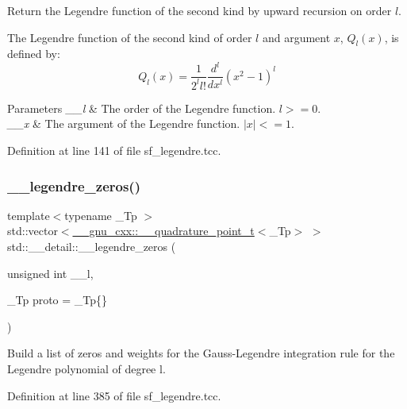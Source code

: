 Return the Legendre function of the second kind by upward recursion on order $ l $. 

The Legendre function of the second kind of order $ l $ and argument $ x $, $ Q_l(x) $, is defined by\+: \[ Q_l(x) = \frac{1}{2^l l!}\frac{d^l}{dx^l}(x^2 - 1)^{l} \]


\begin{DoxyParams}{Parameters}
{\em \+\_\+\+\_\+l} & The order of the Legendre function. $l >= 0$. \\
\hline
{\em \+\_\+\+\_\+x} & The argument of the Legendre function. $|x| <= 1$. \\
\hline
\end{DoxyParams}


Definition at line 141 of file sf\+\_\+legendre.\+tcc.

\mbox{\label{namespacestd_1_1____detail_a9d53ac0fd39232190e7564fa067a878d}} 
\subsubsection{\texorpdfstring{\+\_\+\+\_\+legendre\+\_\+zeros()}{\_\_legendre\_zeros()}}
{\footnotesize\ttfamily template$<$typename \+\_\+\+Tp $>$ \\
std\+::vector$<$\hyperlink{struct____gnu__cxx_1_1____quadrature__point__t}{\+\_\+\+\_\+gnu\+\_\+cxx\+::\+\_\+\+\_\+quadrature\+\_\+point\+\_\+t}$<$\+\_\+\+Tp$>$ $>$ std\+::\+\_\+\+\_\+detail\+::\+\_\+\+\_\+legendre\+\_\+zeros (\begin{DoxyParamCaption}\item[{unsigned int}]{\+\_\+\+\_\+l,  }\item[{\+\_\+\+Tp}]{proto = {\ttfamily \+\_\+Tp\{\}} }\end{DoxyParamCaption})}

Build a list of zeros and weights for the Gauss-\/\+Legendre integration rule for the Legendre polynomial of degree {\ttfamily l}. 

Definition at line 385 of file sf\+\_\+legendre.\+tcc.

\mbox{\label{namespacestd_1_1____detail_a087d65f98ba6a6709b4d62fa32445e59}} 
